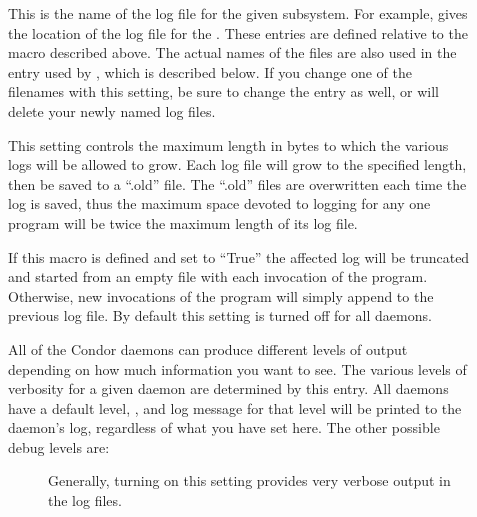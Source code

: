 \begin{description}
 
\item[] \label{param:SubsysLog} This is the name of
  the log file for the given subsystem.  For example,
   gives the location of the log file for the
  .  These entries are defined relative to the
   macro described above.  The actual names of the files
  are also used in the  entry used by
  , which is described below.  If you change one of the
  filenames with this setting, be sure to change the
   entry as well, or  will
  delete your newly named log files.  
  
\item[] \label{param:MaxSubsysLog} This
  setting controls the maximum length in bytes to which the various
  logs will be allowed to grow.  Each log file will grow to the
  specified length, then be saved to a ``.old'' file.  The ``.old''
  files are overwritten each time the log is saved, thus the maximum
  space devoted to logging for any one program will be twice the
  maximum length of its log file.

\item[]
  \label{param:TruncSubsysLogOnOpen}  If this macro is defined and set
  to ``True'' the affected log will be truncated and started from an
  empty file with each invocation of the program.  Otherwise, new
  invocations of the program will simply append to the previous log
  file.  By default this setting is turned off for all daemons. 

\item[] \label{param:SubsysDebug} All of the
  Condor daemons can produce different levels of output depending on
  how much information you want to see.  The various levels of
  verbosity for a given daemon are determined by this entry.  All
  daemons have a default level, , and log message for
  that level will be printed to the daemon's log, regardless of what
  you have set here.  The other possible debug levels are:

\begin{description}
  
\item[] \label{dflag:fulldebug} Generally, turning on
  this setting provides very verbose output in the log files.


\end{description}
\end{description}
